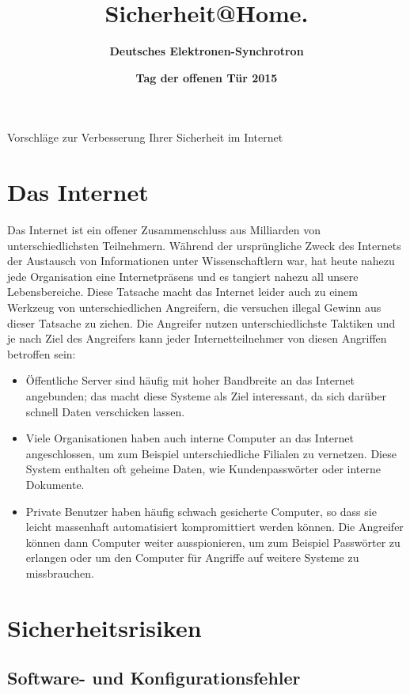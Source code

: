 \documentclass[10pt,foldmark,tumble]{leaflet}
\title{\textcolor{DESYBlue}{\bf Sicherheit@Home}\textcolor{DESYOrange}{\bf.}}
\author{%
\Large \textcolor{DESYBlue}{\bf Deutsches Elektronen-Synchrotron}
}
\date{\textcolor{DESYOrange}{\bf Tag der offenen Tür 2015}}
\begin{document}
\maketitle

Vorschläge zur Verbesserung Ihrer Sicherheit im Internet

\newpage

\section{Das Internet}

Das Internet ist ein offener Zusammenschluss aus Milliarden von unterschiedlichsten
Teilnehmern. Während der ursprüngliche Zweck des Internets der Austausch von Informationen
unter Wissenschaftlern war, hat heute nahezu jede Organisation eine Internetpräsens und
es tangiert nahezu all unsere Lebensbereiche. Diese Tatsache macht das Internet leider auch
zu einem Werkzeug von unterschiedlichen Angreifern, die versuchen illegal Gewinn aus dieser
Tatsache zu ziehen.
Die Angreifer nutzen unterschiedlichste Taktiken und je nach Ziel des Angreifers kann jeder
Internetteilnehmer von diesen Angriffen betroffen sein:

\begin{itemize}
 \item Öffentliche Server sind häufig mit hoher Bandbreite an das Internet angebunden; das 
 macht diese Systeme als Ziel interessant, da sich darüber schnell Daten verschicken lassen.
 \item Viele Organisationen haben auch interne Computer an das Internet angeschlossen, um 
 zum Beispiel unterschiedliche Filialen zu vernetzen. Diese System enthalten oft geheime Daten, 
 wie Kundenpasswörter oder interne Dokumente.
 \item Private Benutzer haben häufig schwach gesicherte Computer, so dass sie leicht massenhaft
 automatisiert kompromittiert werden können. Die Angreifer können dann Computer weiter ausspionieren, 
 um zum Beispiel Passwörter zu erlangen oder um den Computer für Angriffe auf weitere Systeme 
 zu missbrauchen.
\end{itemize}

\section{Sicherheitsrisiken}

\subsection{Software- und Konfigurationsfehler}
\end{document}
